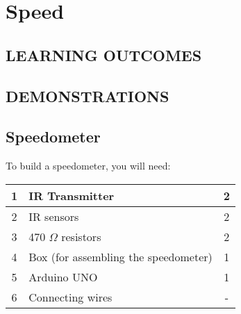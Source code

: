 \chapter{Speed}

\section*{LEARNING OUTCOMES}
{
\begin{center}
\end{center}
}

\section*{DEMONSTRATIONS}
\section*{Speedometer}

To build a speedometer, you will need:

\begin{table}[H]
    \centering
    \begin{tabular}{|c|l|c|}\hline
    1   &   IR Transmitter          &   2\\\hline
    2   &   IR sensors              &   2\\\hline
    3   &   470 $\Omega$ resistors  &   2\\\hline
    4   &   Box (for assembling the speedometer)     &   1\\\hline
    5   &   Arduino UNO             &   1\\\hline
    6   &   Connecting wires        &   -\\\hline
    \end{tabular}
\end{table}

